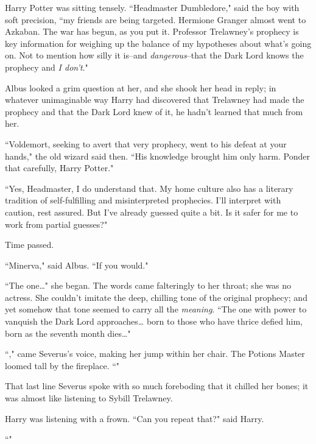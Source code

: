 Harry Potter was sitting tensely. ``Headmaster Dumbledore," said the boy with soft precision, ``my friends are being targeted. Hermione Granger almost went to Azkaban. The war has begun, as you put it. Professor Trelawney's prophecy is key information for weighing up the balance of my hypotheses about what's going on. Not to mention how silly it is\---and \emph{dangerous}\---that the Dark Lord knows the prophecy and \emph{I don't}."

Albus looked a grim question at her, and she shook her head in reply; in whatever unimaginable way Harry had discovered that Trelawney had made the prophecy and that the Dark Lord knew of it, he hadn't learned that much from her.

``Voldemort, seeking to avert that very prophecy, went to his defeat at your hands," the old wizard said then. ``His knowledge brought him only harm. Ponder that carefully, Harry Potter."

``Yes, Headmaster, I do understand that. My home culture also has a literary tradition of self-fulfilling and misinterpreted prophecies. I'll interpret with caution, rest assured. But I've already guessed quite a bit. Is it safer for me to work from partial guesses?"

Time passed.

``Minerva," said Albus. ``If you would."

``The one{\ldots}" she began. The words came falteringly to her throat; she was no actress. She couldn't imitate the deep, chilling tone of the original prophecy; and yet somehow that tone seemed to carry all the \emph{meaning}. ``The one with power to vanquish the Dark Lord approaches{\ldots} born to those who have thrice defied him, born as the seventh month dies{\ldots}"

``," came Severus's voice, making her jump within her chair. The Potions Master loomed tall by the fireplace. ``"

That last line Severus spoke with so much foreboding that it chilled her bones; it was almost like listening to Sybill Trelawney.

Harry was listening with a frown. ``Can you repeat that?" said Harry.

``"

